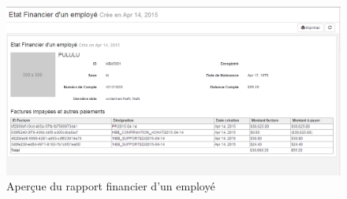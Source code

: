 \documentclass[12pt,a4paper]{report}
\begin{document}
\begin{figure}[h]
\begin{center}
\includegraphics[width=14cm]{pic/EtFinancierEmployer.png}
\end{center}
\caption{Aperçue du rapport financier d'un employé}
\label{Aperçue du rapport financier d'un employé}
\end{figure}



\tableofcontents
\end{document}
